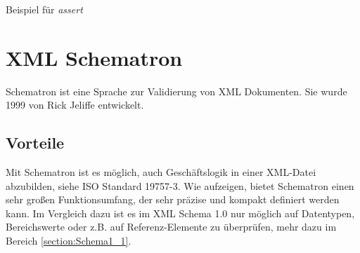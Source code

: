 \begin{program}
\centering
{}
    
\caption{Beispiel für \emph{assert}  
}
\label{fig:AssertExp}
\end{program}


\begin{program}
\centering
{}
    
\caption{Beispiel für \emph{alternative}  %
}
\label{fig:AlternativeExp}
\end{program}

\section{XML Schematron}
\label{cha:Schematron}
Schematron ist eine Sprache zur Validierung von XML Dokumenten. Sie wurde 1999 von Rick Jeliffe entwickelt.

\subsection{Vorteile}
Mit Schematron ist es möglich, auch Geschäftslogik in einer XML-Datei abzubilden, siehe ISO Standard 19757-3\nocite{ISO_IEC19757}. Wie  \textcite{Lee2000ComparativeAO} aufzeigen, bietet Schematron einen sehr großen Funktionsumfang, der sehr präzise und kompakt definiert werden kann.
Im Vergleich dazu ist es im XML Schema 1.0 nur möglich auf Datentypen, Bereichswerte oder z.B. auf Referenz-Elemente zu überprüfen, mehr dazu im Bereich \ref{section:Schema1_1}.

